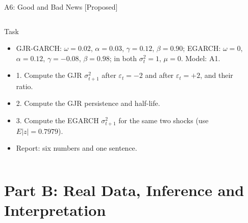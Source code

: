 \begin{frame}{A6: Good and Bad News [Proposed]}
\propsub
\itemsize{\scriptsize}
\begin{columns}[T]
\begin{column}{\taskw}
\begin{block}{Task}
\begin{itemize}
    \item GJR-GARCH: $\omega = 0.02$, $\alpha = 0.03$, $\gamma = 0.12$, $\beta = 0.90$; EGARCH: $\omega = 0$, $\alpha = 0.12$, $\gamma = -0.08$, $\beta = 0.98$; in both $\sigma_t^2 = 1$, $\mu = 0$. Model: A1.
    \item 1. Compute the GJR $\sigma_{t+1}^2$ after $\varepsilon_t = -2$ and after $\varepsilon_t = +2$, and their ratio.
    \item 2. Compute the GJR persistence and half-life.
    \item 3. Compute the EGARCH $\sigma_{t+1}^2$ for the same two shocks (use $E|z| = 0.7979$).
    \item Report: six numbers and one sentence.
\end{itemize}
\end{block}
\end{column}
\begin{column}{\solw}
\end{column}
\end{columns}
\end{frame}


\section{Part B: Real Data, Inference and Interpretation}

